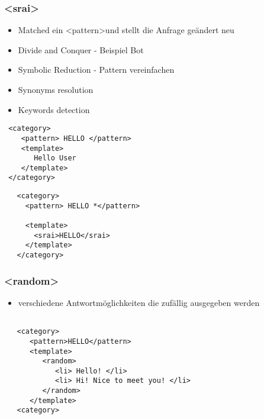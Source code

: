 \documentclass[9pt]{beamer}
\begin{document}
\begin{frame}[fragile]
  \frametitle{\textless srai\textgreater}
\begin{itemize}
\item Matched ein \textless pattern\textgreater und stellt die Anfrage geändert neu

\item Divide and Conquer - Beispiel Bot

\item Symbolic Reduction - Pattern vereinfachen

\item Synonyms resolution

\item Keywords detection
\end{itemize}
  \begin{lstlisting}
 <category> 
    <pattern> HELLO </pattern> 
    <template>  
       Hello User
    </template> 
 </category> 
  \end{lstlisting}
  \begin{lstlisting}
   <category>
     <pattern> HELLO *</pattern>

     <template>
       <srai>HELLO</srai>
     </template>
   </category>
  \end{lstlisting}
\end{frame}

\begin{frame}[fragile]
  \frametitle{\textless random\textgreater}
\begin{itemize}
\item verschiedene Antwortmöglichkeiten die zufällig ausgegeben werden\\
  \end{itemize}
\begin{lstlisting}

   <category>
      <pattern>HELLO</pattern>
      <template>
         <random>
            <li> Hello! </li>
            <li> Hi! Nice to meet you! </li>
         </random>
      </template>
   <category>

\end{lstlisting}
\end{frame}
\end{document}
